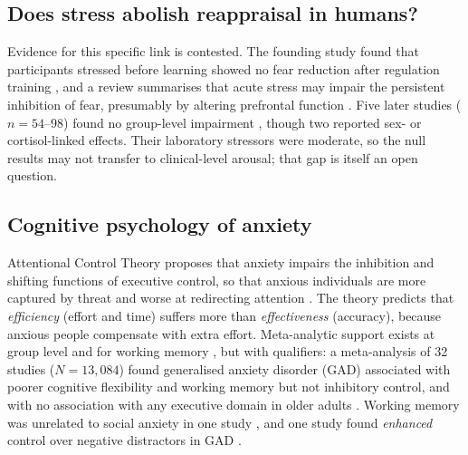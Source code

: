 \subsection{Does stress abolish reappraisal in humans?}
Evidence for this specific link is contested. The founding study found that participants stressed before learning showed no fear reduction after regulation training \citep{raio2013stress}, and a review summarises that acute stress may impair the persistent inhibition of fear, presumably by altering prefrontal function \citep{raio2015influence}. Five later studies ($n=54$--$98$) found no group-level impairment \citep{shermohammed2017stress,sandner2021withstands,langer2021delayed,langer2023rapid,hamza2024acceptance}, though two reported sex- or cortisol-linked effects. Their laboratory stressors were moderate, so the null results may not transfer to clinical-level arousal; that gap is itself an open question.

\subsection{Cognitive psychology of anxiety}
Attentional Control Theory proposes that anxiety impairs the inhibition and shifting functions of executive control, so that anxious individuals are more captured by threat and worse at redirecting attention \citep{eysenck2007act}. The theory predicts that \emph{efficiency} (effort and time) suffers more than \emph{effectiveness} (accuracy), because anxious people compensate with extra effort. Meta-analytic support exists at group level \citep[$g=-0.58$;][]{shi2019attentional} and for working memory \citep[$g=-0.334$;][]{moran2016working}, but with qualifiers: a meta-analysis of 32 studies ($N=13{,}084$) found generalised anxiety disorder (GAD) associated with poorer cognitive flexibility and working memory but not inhibitory control, and with no association with any executive domain in older adults \citep{nguyen2025executive}. Working memory was unrelated to social anxiety in one study \citep{harrison2025executive}, and one study found \emph{enhanced} control over negative distractors in GAD \citep{hallion2019enhanced}.
